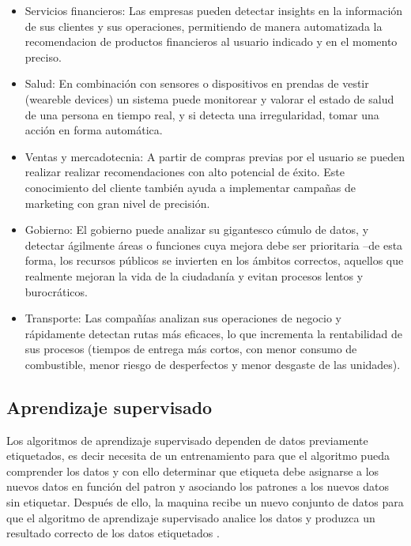 \begin{itemize}
	\item Servicios financieros: Las empresas pueden detectar insights en la información de sus clientes 
	y sus operaciones, permitiendo de manera automatizada la recomendacion de productos financieros al usuario 
	indicado y en el momento preciso.
	\item Salud: En combinación con sensores o dispositivos en prendas de vestir (weareble devices) 
	un sistema puede monitorear y valorar el estado de salud de una persona en tiempo real, y si detecta 
	una irregularidad, tomar una acción en forma automática.
	\item Ventas y mercadotecnia: A partir de compras previas por el usuario se pueden realizar 
	realizar recomendaciones con alto potencial de éxito. Este conocimiento del cliente también ayuda a implementar 
	campañas de marketing con gran nivel de precisión.
	\item Gobierno:  El gobierno puede analizar su gigantesco cúmulo de datos, y detectar ágilmente áreas o
	funciones cuya mejora debe ser prioritaria –de esta forma, los recursos	públicos se invierten en los ámbitos 
	correctos, aquellos que realmente mejoran la vida de la ciudadanía y evitan procesos lentos y burocráticos.
	\item Transporte: Las compañías analizan sus operaciones de negocio y rápidamente detectan rutas más
	eficaces, lo que incrementa la rentabilidad de sus procesos (tiempos de entrega más cortos, con menor consumo 
	de combustible, menor riesgo de desperfectos y menor desgaste de las unidades).
\end{itemize}

\subsection{Aprendizaje supervisado}
Los algoritmos de aprendizaje supervisado dependen de datos previamente etiquetados, es decir necesita de un entrenamiento para 
que el algoritmo pueda comprender los datos y con ello determinar que etiqueta debe asignarse a los nuevos datos 
en función del patron y asociando los patrones a los nuevos datos sin etiquetar. Después de ello, la maquina recibe 
un nuevo conjunto de datos para que el algoritmo de aprendizaje supervisado analice los datos y produzca un resultado 
correcto de los datos etiquetados \citep{CT4}.


